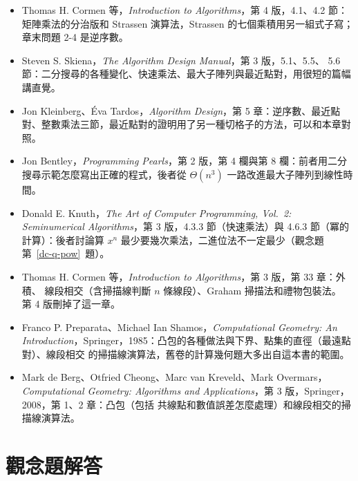 \begin{itemize}
\item Thomas H. Cormen 等，\textit{Introduction to Algorithms}，第 4 版，4.1、4.2 節：
矩陣乘法的分治版和 Strassen 演算法，Strassen 的七個乘積用另一組式子寫；章末問題
2-4 是逆序數。
\item Steven S. Skiena，\textit{The Algorithm Design Manual}，第 3 版，5.1、5.5、
5.6 節：二分搜尋的各種變化、快速乘法、最大子陣列與最近點對，用很短的篇幅講直覺。
\item Jon Kleinberg、Éva Tardos，\textit{Algorithm Design}，第 5 章：逆序數、最近點
對、整數乘法三節，最近點對的證明用了另一種切格子的方法，可以和本章對照。
\item Jon Bentley，\textit{Programming Pearls}，第 2 版，第 4 欄與第 8 欄：前者用二分
搜尋示範怎麼寫出正確的程式，後者從 $\Theta(n^3)$ 一路改進最大子陣列到線性時間。
\item Donald E. Knuth，\textit{The Art of Computer Programming, Vol.~2: Seminumerical
Algorithms}，第 3 版，4.3.3 節（快速乘法）與 4.6.3 節（冪的計算）：後者討論算 $x^n$
最少要幾次乘法，二進位法不一定最少（觀念題第~\ref{dc-q-pow}~題）。
\item Thomas H. Cormen 等，\textit{Introduction to Algorithms}，第 3 版，第 33 章：外積、
線段相交（含掃描線判斷 $n$ 條線段）、Graham 掃描法和禮物包裝法。 第 4 版刪掉了這一章。
\item Franco P. Preparata、Michael Ian Shamos，\textit{Computational Geometry: An
Introduction}，Springer，1985：凸包的各種做法與下界、點集的直徑（最遠點對）、線段相交
的掃描線演算法，舊卷的計算幾何題大多出自這本書的範圍。
\item Mark de Berg、Otfried Cheong、Marc van Kreveld、Mark Overmars，\textit{Computational
Geometry: Algorithms and Applications}，第 3 版，Springer，2008，第 1、2 章：凸包（包括
共線點和數值誤差怎麼處理）和線段相交的掃描線演算法。
\end{itemize}

\section*{觀念題解答}

